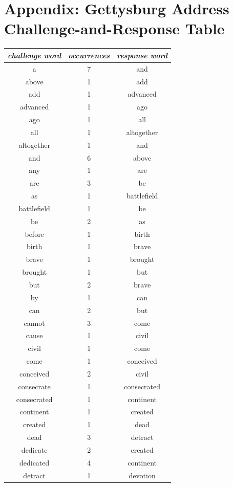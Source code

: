 \newpage

\section*{Appendix: Gettysburg Address Challenge-and-Response Table}

\begin{multicols}{2}
\scriptsize
\begin{tabular}{ccc}
\textit{challenge word} & \textit{occurrences} & \textit{response word} \\ \hline
a & 7 & and \\
above & 1 & add \\
add & 1 & advanced \\
advanced & 1 & ago \\
ago & 1 & all \\
all & 1 & altogether \\
altogether & 1 & and \\
and & 6 & above \\
any & 1 & are \\
are & 3 & be \\
as & 1 & battlefield \\
battlefield & 1 & be \\
be & 2 & as \\
before & 1 & birth \\
birth & 1 & brave \\
brave & 1 & brought \\
brought & 1 & but \\
but & 2 & brave \\
by & 1 & can \\
can & 2 & but \\
cannot & 3 & come \\
cause & 1 & civil \\
civil & 1 & come \\
come & 1 & conceived \\
conceived & 2 & civil \\
consecrate & 1 & consecrated \\
consecrated & 1 & continent \\
continent & 1 & created \\
created & 1 & dead \\
dead & 3 & detract \\
dedicate & 2 & created \\
dedicated & 4 & continent \\
detract & 1 & devotion \\

\end{tabular}
\end{multicols}
